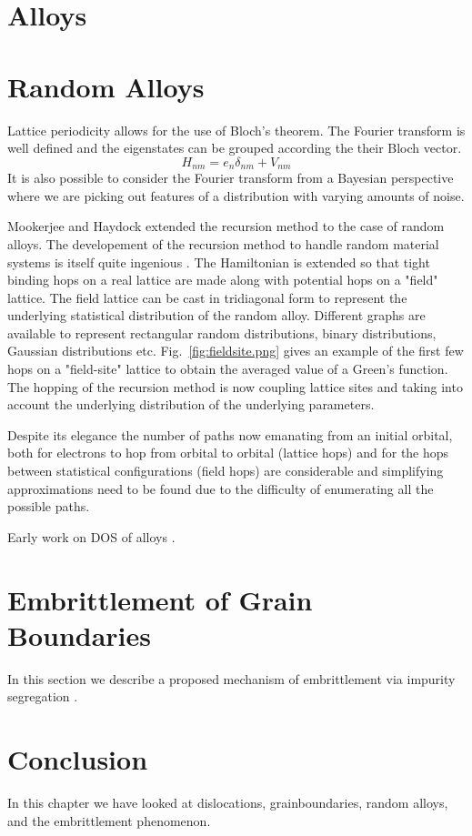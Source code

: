 \section{Alloys}
\section{Random Alloys}
Lattice periodicity allows for the use of Bloch's theorem. The Fourier transform
is well defined and the eigenstates can be grouped according the their Bloch vector.
%
\begin{equation}
H_{nm} = e_{n}\delta_{nm} + V_{nm}
\end{equation}
%
It is also possible to consider the Fourier transform from a Bayesian perspective
where we are picking out features of a distribution with varying amounts of noise.

Mookerjee and Haydock extended the recursion method to the case of random alloys.
The developement of the recursion method to handle random material systems is 
itself quite ingenious \cite{mookerjee , haydock74}. The Hamiltonian is extended
so that tight binding hops on a real lattice are made along with potential hops
on a "field" lattice. The field lattice can be cast in tridiagonal form to represent
the underlying statistical distribution of the random alloy. Different graphs are available
to represent rectangular random distributions, binary distributions, Gaussian distributions
etc. Fig.~\ref{fig:fieldsite.png} gives an example of the first few hops on a "field-site" 
lattice to obtain the averaged value of a Green's function. The hopping of the recursion method
is now coupling lattice sites and taking into account the underlying distribution of 
the underlying parameters.

Despite its elegance the number of paths now emanating from an initial orbital, both
for electrons to hop from orbital to orbital (lattice hops) and for the hops between 
statistical configurations (field hops) are considerable and simplifying approximations 
need to be found due to the difficulty of enumerating all the possible paths.

Early work on DOS of alloys \cite{cubiotti77}. 

\section{Embrittlement of Grain Boundaries}
In this section we describe a proposed mechanism of embrittlement via impurity
segregation \cite{haydock82}.

\section{Conclusion}
In this chapter we have looked at dislocations, grainboundaries, random alloys, and the embrittlement
phenomenon.

